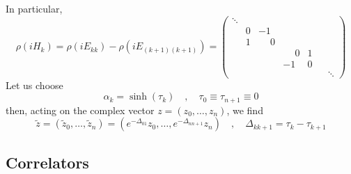 \documentclass[a4paper,11pt]{article}
\theoremstyle{definition}
\begin{document}
In particular, 
\begin{equation}
  \rho(iH_k) = \rho(iE_{kk}) - \rho(iE_{(k+1)(k+1)}) = 
  \begin{pmatrix} 
    \ddots & & & &\\
    & 0 & -1 & & & \\
    & 1 & \phantom{-}0 & &\\
    & & & \phantom{-}0 & 1 &\\
    & & & -1 & 0 &\\
    & & & & & & \ddots
  \end{pmatrix}
\end{equation}
Let us choose 
\begin{equation}
  \alpha_k = \sinh(\tau_k) \quad , \quad \tau_0 \equiv \tau_{n+1} \equiv 0
\end{equation}
then, acting on the complex vector $z = (z_0, \dots, z_n)$, we find 
\begin{equation}
  \boxed{
    \tilde z = (\tilde z_0, \dots, \tilde z_n) = ( e^{-\Delta_{01}}z_0, \dots, e^{-\Delta_{nn+1}}z_n) \quad , \quad \Delta_{kk+1} = \tau_k - \tau_{k+1}
}
\end{equation}

\subsection{Correlators}
\end{document}
